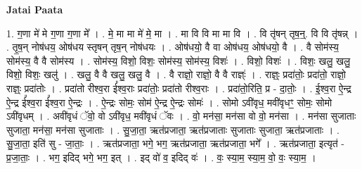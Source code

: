 \documentclass[17pt]{extarticle}
\begin{document}
\textbf{Jatai Paata} \newline

1. ग॒णा मे॑ मे ग॒णा ग॒णा मे᳚ । . मे॒ मा मा मे॑ मे॒ मा । . मा वि वि मा मा वि । . वि तृ॑षन् तृष॒न्॒. वि वि तृ॑षन्न् । . तृ॒ष॒न् नोष॑धय॒ ओष॑धय स्तृषन् तृष॒न् नोष॑धयः । . ओष॑धयो॒ वै वा ओष॑धय॒ ओष॑धयो॒ वै । . वै सोम॑स्य॒ सोम॑स्य॒ वै वै सोम॑स्य । . सोम॑स्य॒ विशो॒ विशः॒ सोम॑स्य॒ सोम॑स्य॒ विशः॑ । . विशो॒ विशः॑ । . विशः॒ खलु॒ खलु॒ विशो॒ विशः॒ खलु॑ । . खलु॒ वै वै खलु॒ खलु॒ वै । . वै राज्ञो॒ राज्ञो॒ वै वै राज्ञ्ः॑ । . राज्ञ्ः॒ प्रदा॑तोः॒ प्रदा॑तो॒ राज्ञो॒ राज्ञ्ः॒ प्रदा॑तोः । . प्रदा॑तो रीश्व॒रा ई᳚श्व॒राः प्रदा॑तोः॒ प्रदा॑तो रीश्व॒राः । . प्रदा॑तो॒रिति॒ प्र - दा॒तोः॒ । . ई॒श्व॒रा ऐ॒न्द्र ऐ॒न्द्र ई᳚श्व॒रा ई᳚श्व॒रा ऐ॒न्द्रः । . ऐ॒न्द्रः सोमः॒ सोम॑ ऐ॒न्द्र ऐ॒न्द्रः सोमः॑ । . सोमो ऽवी॑वृध॒ मवी॑वृधꣳ॒॒ सोमः॒ सोमो ऽवी॑वृधम् । . अवी॑वृधं ॅवो॒ वो ऽवी॑वृध॒ मवी॑वृधं ॅवः । . वो॒ मन॑सा॒ मन॑सा वो वो॒ मन॑सा । . मन॑सा सुजाताः सुजाता॒ मन॑सा॒ मन॑सा सुजाताः । . सु॒जा॒ता॒ ऋत॑प्रजाता॒ ऋत॑प्रजाताः सुजाताः सुजाता॒ ऋत॑प्रजाताः । . सु॒जा॒ता॒ इति॑ सु - जा॒ताः॒ । . ऋत॑प्रजाता॒ भगे॒ भग॒ ऋत॑प्रजाता॒ ऋत॑प्रजाता॒ भगे᳚ । . ऋत॑प्रजाता॒ इत्यृत॑ - प्र॒जा॒ताः॒ । . भग॒ इदिद् भगे॒ भग॒ इत् । . इद् वो॑ व॒ इदिद् वः॑ । . वः॒ स्या॒म॒ स्या॒म॒ वो॒ वः॒ स्या॒म॒ । \newline
\end{document}
